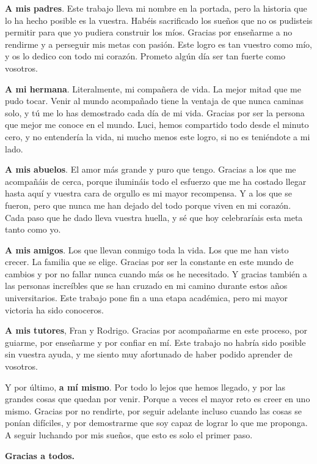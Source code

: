 \begin{umaacknowledgments}

\itshape

\begin{flushright}

\textbf{A mis padres}. Este trabajo lleva mi nombre en la portada, pero la historia que lo ha hecho posible es la vuestra. 
Habéis sacrificado los sueños que no os pudisteis permitir para que yo pudiera construir los míos.
Gracias por enseñarme a no rendirme y a perseguir mis metas con pasión. Este logro es tan vuestro como mío, y os lo dedico con todo mi corazón. Prometo algún día ser tan fuerte como vosotros.

\textbf{A mi hermana}. Literalmente, mi compañera de vida. La mejor mitad que me pudo tocar. Venir al mundo acompañado tiene la ventaja de que nunca caminas solo, y tú me lo has demostrado cada día de mi vida.
Gracias por ser la persona que mejor me conoce en el mundo. Luci, hemos compartido todo desde el minuto cero, y no entendería la vida, ni mucho menos este logro, si no es teniéndote a mi lado.

\textbf{A mis abuelos}. El amor más grande y puro que tengo. Gracias a los que me acompañáis de cerca, porque ilumináis todo el esfuerzo que me ha costado llegar hasta aquí y vuestra cara de orgullo es mi mayor recompensa. Y a los que se fueron, pero que nunca me han dejado del todo porque viven en mi corazón. Cada paso que he dado lleva vuestra huella, y sé que hoy celebraríais esta meta tanto como yo.

\textbf{A mis amigos}. Los que llevan conmigo toda la vida. Los que me han visto crecer. La familia que se elige. Gracias por ser la constante en este mundo de cambios y por no fallar nunca cuando más os he necesitado. 
Y gracias también a las personas increíbles que se han cruzado en mi camino durante estos años universitarios. Este trabajo pone fin a una etapa académica, pero mi mayor victoria ha sido conoceros.

\textbf{A mis tutores}, Fran y Rodrigo. Gracias por acompañarme en este proceso, por guiarme, por enseñarme y por confiar en mí. Este trabajo no habría sido posible sin vuestra ayuda, y me siento muy afortunado de haber podido aprender de vosotros.

Y por último, \textbf{a mí mismo}. Por todo lo lejos que hemos llegado, y por las grandes cosas que quedan por venir. Porque a veces el mayor reto es creer en uno mismo. Gracias por no rendirte, por seguir adelante incluso cuando las cosas se ponían difíciles, y por demostrarme que soy capaz de lograr lo que me proponga. A seguir luchando por mis sueños, que esto es solo el primer paso.

\textbf{Gracias a todos.}
\end{flushright}

\end{umaacknowledgments}
